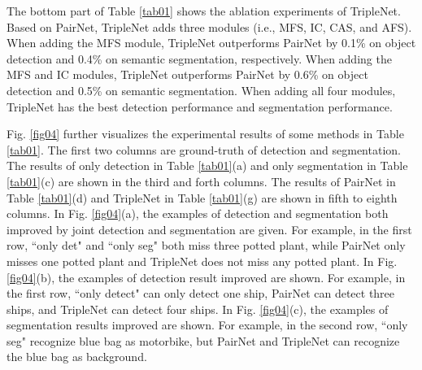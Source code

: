 \documentclass[10pt,twocolumn,letterpaper]{article}
\begin{document}
The bottom part of Table \ref{tab01} shows the ablation experiments of TripleNet. Based on PairNet, TripleNet adds three modules (i.e., MFS, IC, CAS, and AFS). When adding the MFS module, TripleNet outperforms PairNet by 0.1\% on object detection and 0.4\% on semantic segmentation, respectively.  When adding the MFS and IC modules, TripleNet outperforms PairNet by 0.6\% on object detection and 0.5\% on semantic segmentation. When adding all four modules, TripleNet has the best detection performance and segmentation performance.


Fig. \ref{fig04} further visualizes the experimental results of some methods in Table \ref{tab01}. The first two columns are ground-truth of detection and segmentation.  The results of only detection in Table \ref{tab01}(a) and only segmentation in Table \ref{tab01}(c) are shown in the third and forth columns. The results of PairNet in Table \ref{tab01}(d) and TripleNet in Table \ref{tab01}(g) are shown in fifth to eighth columns. In Fig. \ref{fig04}(a), the examples of detection and segmentation both improved by joint detection and segmentation are given. For example, in the first row, ``only det" and ``only seg" both miss three potted plant, while PairNet only misses one potted plant and TripleNet does not miss any potted plant. In Fig. \ref{fig04}(b), the examples of detection result improved are shown. For example, in the first row, ``only detect" can only detect one ship, PairNet can detect three ships, and TripleNet can detect four ships. In Fig. \ref{fig04}(c), the examples of segmentation results improved are shown. For example, in the second row, ``only seg" recognize blue bag as motorbike, but PairNet and TripleNet can recognize the blue bag as background. 


\begin{table}
\renewcommand{\arraystretch}{1.2}
\footnotesize
\begin{center}
\end{center}
\caption{Comparison of BlitzNet, the proposed PairNet, and the proposed TripleNet. All the methods are re-implemented in the same parameter settings. }
\label{tab02}
\end{table}
\end{document}
